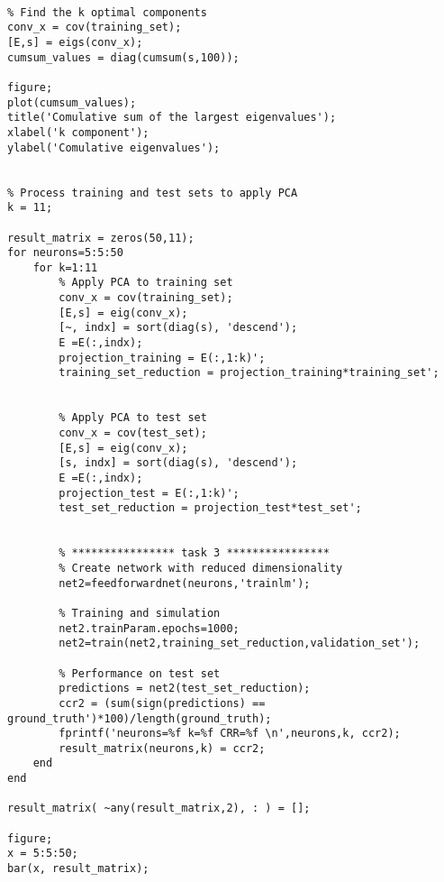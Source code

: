 \begin{lstlisting}[frame=single]
% **************** task 2 ****************

% Find the k optimal components
conv_x = cov(training_set);
[E,s] = eigs(conv_x);
cumsum_values = diag(cumsum(s,100));

figure;
plot(cumsum_values);
title('Comulative sum of the largest eigenvalues');
xlabel('k component');
ylabel('Comulative eigenvalues');


% Process training and test sets to apply PCA
k = 11;

result_matrix = zeros(50,11);
for neurons=5:5:50
    for k=1:11
        % Apply PCA to training set
        conv_x = cov(training_set);
        [E,s] = eig(conv_x);
        [~, indx] = sort(diag(s), 'descend');
        E =E(:,indx);
        projection_training = E(:,1:k)';
        training_set_reduction = projection_training*training_set';


        % Apply PCA to test set
        conv_x = cov(test_set);
        [E,s] = eig(conv_x);
        [s, indx] = sort(diag(s), 'descend');
        E =E(:,indx);
        projection_test = E(:,1:k)';
        test_set_reduction = projection_test*test_set';


        % **************** task 3 ****************
        % Create network with reduced dimensionality
        net2=feedforwardnet(neurons,'trainlm');

        % Training and simulation
        net2.trainParam.epochs=1000;
        net2=train(net2,training_set_reduction,validation_set');

        % Performance on test set
        predictions = net2(test_set_reduction);
        ccr2 = (sum(sign(predictions) == ground_truth')*100)/length(ground_truth);
        fprintf('neurons=%f k=%f CRR=%f \n',neurons,k, ccr2);
        result_matrix(neurons,k) = ccr2;
    end 
end

result_matrix( ~any(result_matrix,2), : ) = [];

figure;
x = 5:5:50;
bar(x, result_matrix);
\end{lstlisting}
